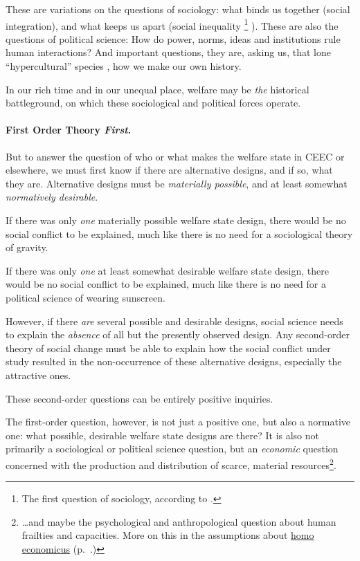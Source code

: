 \documentclass[11pt,a4paper,oneside]{article}
\begin{document}
These are variations on the questions of sociology:
what binds us together (social integration), and what keeps us apart (social inequality
\footnote{
	The first question of sociology, according to \citep[66]{Dahrendorf1966}.
}
).
These are also the questions of political science:
How do power, norms, ideas and institutions rule human interactions?
And important questions, they are, asking us, that lone ``hypercultural'' species \citep{Henrich2004}, how we make our own history.

In our rich time and in our unequal place, welfare may be \emph{the} historical battleground, on which these sociological and political forces operate.

\paragraph{First Order Theory \emph{First}.} But to answer the question of who or what makes the welfare state in \gls{CEEC} or elsewhere, we must first know if there are alternative designs, and if so, what they are.
Alternative designs must be \emph{materially possible}, and at least somewhat \emph{normatively desirable}.

If there was only \emph{one} materially possible welfare state design, there would be no social conflict to be explained, much like there is no need for a sociological theory of gravity.

If there was only \emph{one} at least somewhat desirable welfare state design, there would be no social conflict to be explained, much like there is no need for a political science of wearing sunscreen.

However, if there \emph{are} several possible and desirable designs, social science needs to explain the \emph{absence} of all but the presently observed design.
Any second-order theory of social change must be able to explain how the social conflict under study resulted in the non-occurrence of these alternative designs, especially the attractive ones.

These second-order questions can be entirely positive inquiries.

The first-order question, however, is not just a positive one, but also a normative one:
what possible, desirable welfare state designs are there?
It is also not primarily a sociological or political science question, but an \emph{economic} question concerned with the production and distribution of scarce, material resources\footnote{
	\ldots and maybe the psychological and anthropological question about human frailties and capacities. More on this in the assumptions about \hyperref[it:homo-economicus]{homo economicus} (p.~\pageref{it:homo-economicus}.)
}.
\end{document}
